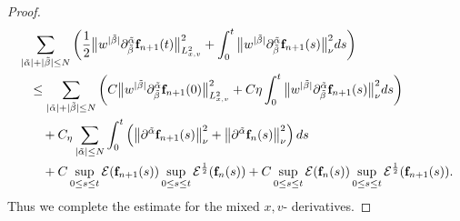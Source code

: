 \documentclass[reqno]{amsart}
\numberwithin{equation}{section}
\numberwithin{equation}{section}
\begin{document}
\begin{proof}
				\begin{align}
					&\sum_{|\tilde{\alpha}| + |\tilde{\beta}| \leq N}\left(\frac{1}{2}\big\|w^{|\tilde{\beta}|}\partial_{\tilde{\beta}}^{\tilde{\alpha}} \mathbf{f}_{n+1}(t)\big\|^2_{L^{2}_{x,v}}+\int_{0}^{t}\big\|w^{|\tilde{\beta}|}\partial_{\tilde{\beta}}^{\tilde{\alpha}} \mathbf{f}_{n+1}(s)\big\|^2_{\nu} ds\right)\notag\\
					&\hspace{0.3cm}\leq \sum_{|\tilde{\alpha}| + |\tilde{\beta}| \leq N}\left(C\big\|w^{|\tilde{\beta}|}\partial_{\tilde{\beta}}^{\tilde{\alpha}} \mathbf{f}_{n+1}(0)\big\|^2_{L^{2}_{x,v}} +C\eta \int_{0}^{t} \big\|w^{|\tilde{\beta}|}\partial_{\tilde{\beta}}^{\tilde{\alpha}} \mathbf{f}_{n+1}(s)\big\|^2_{\nu}ds  \right)\notag\\
					&\hspace{0.3cm}\quad + C_\eta \sum_{|\tilde{\alpha}| \leq N} \int_0^t \left( \big\| \partial^{\tilde{\alpha}} \mathbf{f}_{n+1}(s) \big\|_{\nu}^2 + \big\| \partial^{\tilde{\alpha}} \mathbf{f}_{n}(s) \big\|_{\nu}^2\right)ds \notag \\
					&\hspace{0.3cm}\quad + C \sup_{0 \le s \le t} \mathcal{E}(\mathbf{f}_{n+1}(s)) \sup_{0 \le s \le t} \mathcal{E}^{\frac{1}{2}}(\mathbf{f}_{n}(s)) 
					+ C\sup_{0 \le s \le t} \mathcal{E}(\mathbf{f}_{n}(s)) \sup_{0 \le s \le t} \mathcal{E}^{\frac{1}{2}}(\mathbf{f}_{n+1}(s)). \label{sced75}
				\end{align}
		Thus we complete the estimate for the mixed $x,v$- derivatives.
		

\end{proof}
\end{document}
